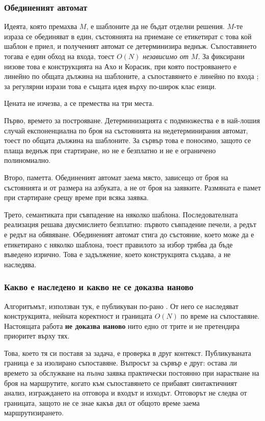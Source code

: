 \subsubsection{Обединеният автомат}

Идеята, която премахва \(M\), е шаблоните да не бъдат отделни решения. \(M\)-те израза се
обединяват в един, състоянията на приемане се етикетират с това кой шаблон е приел, и
полученият автомат се детерминизира веднъж. Съпоставянето тогава е един обход на входа, тоест
\(O(N)\) \emph{независимо от \(M\)}. За фиксирани низове това е конструкцията на Ахо и
Корасик, при която построяването е линейно по общата дължина на шаблоните, а съпоставянето е
линейно по входа \cite{aho1975efficient}; за регулярни изрази това е същата идея върху
по-широк клас езици.

Цената не изчезва, а се премества на три места.

Първо, времето за построяване. Детерминизацията с подмножества е в най-лошия случай
експоненциална по броя на състоянията на недетерминирания автомат, тоест по общата дължина на
шаблоните. За сървър това е поносимо, защото се плаща веднъж при стартиране, но не е
безплатно и не е ограничено полиномиално.

Второ, паметта. Обединеният автомат заема място, зависещо от броя на състоянията и от размера
на азбуката, а не от броя на заявките. Размяната е памет при стартиране срещу време при
всяка заявка.

Трето, семантиката при съвпадение на няколко шаблона. Последователната реализация решава
двусмислието безплатно: първото съвпадение печели, а редът е редът на обявяване. Обединеният
автомат стига до състояние, което може да е етикетирано с няколко шаблона, тоест правилото за
избор трябва да бъде въведено изрично. Това е задължение, което конструкцията създава, а не
наследява.

\subsubsection{Какво е наследено и какво не се доказва наново}

Алгоритъмът, използван тук, е публикуван по-рано \cite{stankov2024regex}. От него се
наследяват конструкцията, нейната коректност и границата \(O(N)\) по време на съпоставяне.
Настоящата работа \textbf{не доказва наново} нито едно от трите и не претендира приоритет
върху тях.

Това, което тя си поставя за задача, е проверка в друг контекст. Публикуваната граница е за изолирано
съпоставяне. Въпросът за сървър е друг: остава ли времето за обслужване на \emph{пълна}
заявка практически постоянно при нарастване на броя на маршрутите, когато към съпоставянето
се прибавят синтактичният анализ, изграждането на отговора и входът и изходът. Отговорът не
следва от границата, защото не се знае какъв дял от общото време заема маршрутизирането.

